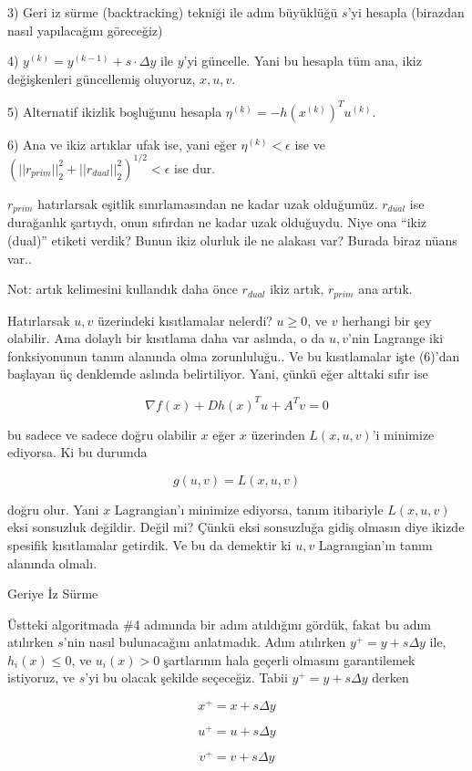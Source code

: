 \documentclass[12pt,fleqn]{article}\usepackage{../../common}
\begin{document}
3) Geri iz sürme (backtracking) tekniği ile adım büyüklüğü $s$'yi hesapla
(birazdan nasıl yapılacağını göreceğiz)

4) $y^{(k)} = y^{(k-1)} + s \cdot \Delta y$ ile $y$'yi güncelle. Yani bu
hesapla tüm ana, ikiz değişkenleri güncellemiş oluyoruz, $x,u,v$. 

5) Alternatif ikizlik boşluğunu hesapla $\eta^{(k)} = -h(x^{(k)})^T
u^{(k)}$. 

6) Ana ve ikiz artıklar ufak ise, yani eğer $\eta^{(k)} < \epsilon$ ise ve 
$(|| r_{prim} ||_2^2 + ||r_{dual}||_2^2)^{1/2} < \epsilon$ ise dur. 

$r_{prim}$ hatırlarsak eşitlik sınırlamasından ne kadar uzak
olduğumüz. $r_{dual}$ ise durağanlık şartıydı, onun sıfırdan ne kadar uzak
olduğuydu. Niye ona ``ikiz (dual)'' etiketi verdik? Bunun ikiz olurluk ile
ne alakası var? Burada biraz nüans var.. 

Not: artık kelimesini kullandık daha önce  $r_{dual}$ ikiz artık,
$r_{prim}$ ana artık. 

Hatırlarsak $u,v$ üzerindeki kısıtlamalar nelerdi? $u \ge 0$, ve $v$
herhangi bir şey olabilir. Ama dolaylı bir kısıtlama daha var aslında, o da
$u,v$'nin Lagrange iki fonksiyonunun tanım alanında olma zorunluluğu.. Ve
bu kısıtlamalar işte (6)'dan başlayan üç denklemde aslında belirtiliyor. 
Yani, çünkü eğer alttaki sıfır ise

$$
\nabla f(x) + D h(x)^T u + A^T v = 0
$$

bu sadece ve sadece doğru olabilir $x$ eğer $x$ üzerinden $L(x,u,v)$'i
minimize ediyorsa. Ki bu durumda 

$$
g(u,v) = L(x,u,v)
$$

doğru olur. Yani $x$ Lagrangian'ı minimize ediyorsa, tanım itibariyle
$L(x,u,v)$ eksi sonsuzluk değildir. Değil mi? Çünkü eksi sonsuzluğa gidiş
olmasın diye ikizde spesifik kısıtlamalar getirdik. Ve bu da demektir ki
$u,v$ Lagrangian'ın tanım alanında olmalı.

Geriye İz Sürme

Üstteki algoritmada \#4 adımında bir adım atıldığını gördük, fakat bu adım
atılırken $s$'nin nasıl bulunacağını anlatmadık. Adım atılırken
$y^+ = y + s \Delta y$ ile, $h_i(x) \le 0$, ve $u_i(x) > 0$ şartlarının
hala geçerli olmasını garantilemek istiyoruz, ve $s$'yi bu olacak şekilde
seçeceğiz. Tabii $y^+ = y + s \Delta y$ derken

$$
x^+ = x + s \Delta y
$$

$$
u^+ = u + s \Delta y
$$

$$
v^+ = v + s \Delta y
$$
\end{document}
